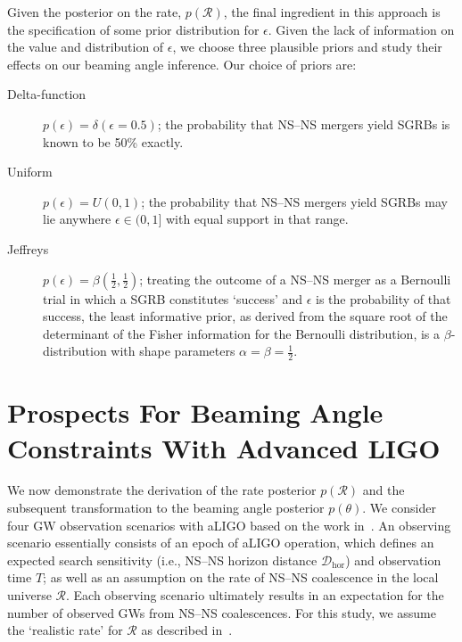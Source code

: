 \documentclass[twocolumn]{aastex61}
\newcommand{\cbcrate}{{{\mathcal R}}}
\newcommand{\dhor}{\ensuremath{{\mathcal D}_{\mathrm{hor}}}}
\newcommand{\BNS}{\ac{NS}--\ac{NS}\xspace}
\begin{document}
Given the posterior on the rate, $p(\cbcrate)$, the final ingredient
in this approach is the specification of some prior distribution for
$\epsilon$. Given the lack of information on the value and distribution
of $\epsilon$, we choose three plausible priors and study their effects
on our beaming angle inference. Our choice of priors are:
%
\begin{description}
\item [Delta-function] $p(\epsilon) = \delta(\epsilon=0.5)$;
        the probability that \BNS mergers yield \acp{SGRB} is known to be 50\%
        exactly.

\item [Uniform] $p(\epsilon)=U(0,1)$;
        the probability that \BNS mergers yield \acp{SGRB} may lie anywhere
    $\epsilon \in (0,1]$ with equal support in that range. 

    \item [Jeffreys] $p(\epsilon)=\beta(\frac{1}{2},\frac{1}{2})$; treating the
        outcome of a \BNS merger as a Bernoulli trial in which a \ac{SGRB}
        constitutes `success' and $\epsilon$ is the probability of that success,
        the least informative prior, as derived from the square root of the
        determinant of the Fisher information for the Bernoulli distribution, is
        a $\beta$-distribution with shape parameters $\alpha=\beta=\frac{1}{2}$.
\end{description}

\section{Prospects For Beaming Angle Constraints With Advanced LIGO}
We now demonstrate the derivation of the rate posterior $p(\cbcrate)$
and the subsequent transformation to the beaming angle posterior
$p(\theta)$.  We consider four \ac{GW} observation scenarios with
\ac{aLIGO} based on the work in~\cite{Aasi:2013wya}.  An observing
scenario essentially consists of an epoch of \ac{aLIGO} operation,
which defines an expected search sensitivity (i.e., \BNS{} horizon
distance $\dhor$) and observation time $T$; as well as an assumption
on the rate of \BNS{} coalescence in the local universe $\cbcrate$.
Each observing scenario ultimately results in an expectation for the
number of observed \acp{GW} from \BNS coalescences.  For this study,
we assume the `realistic rate' for $\cbcrate$ as described
in~\cite{rates_paper}.
\end{document}
